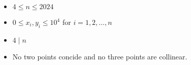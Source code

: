 \begin{itemize}
\tightlist
\item $4 \leq n \leq 2024$
\item $0 \leq x_i,y_i \leq 10^4$ for $i = 1,2,\ldots,n$
\item $4\mid n$
\item No two points concide and no three points are collinear.
\end{itemize}
